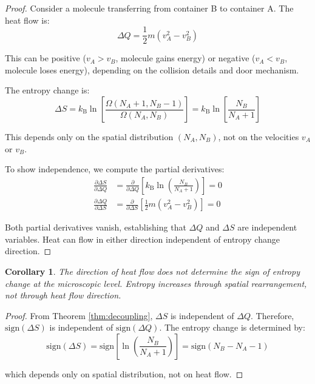 \documentclass[10pt,twocolumn,letterpaper]{article}
\newtheorem{corollary}[theorem]{Corollary}
\theoremstyle{definition}
\theoremstyle{remark}
\newcommand{\kb}{k_\text{B}}
\newcommand{\pderiv}[2]{\frac{\partial #1}{\partial #2}}
\newcommand{\Om}{\Omega}
\begin{document}
\begin{proof}
Consider a molecule transferring from container B to container A. The heat flow is:
\begin{equation}
\Delta Q = \frac{1}{2}m(v_A^2 - v_B^2)
\end{equation}

This can be positive ($v_A > v_B$, molecule gains energy) or negative ($v_A < v_B$, molecule loses energy), depending on the collision details and door mechanism.

The entropy change is:
\begin{equation}
\Delta S = \kb \ln\left[\frac{\Om(N_A+1, N_B-1)}{\Om(N_A, N_B)}\right] = \kb \ln\left[\frac{N_B}{N_A+1}\right]
\end{equation}

This depends only on the spatial distribution $(N_A, N_B)$, not on the velocities $v_A$ or $v_B$.

To show independence, we compute the partial derivatives:
\begin{align}
\pderiv{\Delta S}{\Delta Q} &= \pderiv{}{\Delta Q}\left[\kb \ln\left(\frac{N_B}{N_A+1}\right)\right] = 0 \\
\pderiv{\Delta Q}{\Delta S} &= \pderiv{}{\Delta S}\left[\frac{1}{2}m(v_A^2 - v_B^2)\right] = 0
\end{align}

Both partial derivatives vanish, establishing that $\Delta Q$ and $\Delta S$ are independent variables. Heat can flow in either direction independent of entropy change direction.
\end{proof}

\begin{corollary}
\label{cor:heat_direction_irrelevant}
The direction of heat flow does not determine the sign of entropy change at the microscopic level. Entropy increases through spatial rearrangement, not through heat flow direction.
\end{corollary}

\begin{proof}
From Theorem \ref{thm:decoupling}, $\Delta S$ is independent of $\Delta Q$. Therefore, $\text{sign}(\Delta S)$ is independent of $\text{sign}(\Delta Q)$. The entropy change is determined by:
\begin{equation}
\text{sign}(\Delta S) = \text{sign}\left[\ln\left(\frac{N_B}{N_A+1}\right)\right] = \text{sign}(N_B - N_A - 1)
\end{equation}

which depends only on spatial distribution, not on heat flow.
\end{proof}
\end{document}
